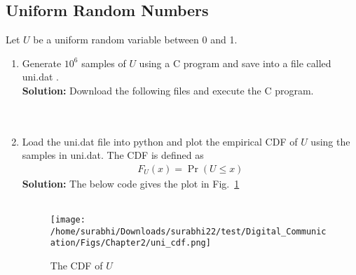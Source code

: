 \documentclass[journal,10pt,twocolumn]{IEEEtran}
\newcounter{Chapcounter}
\numberwithin{equation}{subsection}
\numberwithin{figure}{subsection}
\renewcommand\thesection{\theChapcounter.\arabic{section}}
\newcommand\figref{Fig.~\ref}
\providecommand{\pr}[1]{\ensuremath{\Pr\left(#1\right)}}
\newcommand{\solution}{\noindent \textbf{Solution: }}
\renewcommand\thesection{\arabic{section}}
\renewcommand\thesubsection{\thesection.\arabic{subsection}}
\begin{document}
\subsection{\textbf{Uniform Random Numbers}}
Let $U$ be a uniform random variable between 0 and 1.
\begin{enumerate}[label=\thesubsection.\arabic*,ref=\thesubsection.\arabic{figure}]%
\item
Generate $10^6$ samples of $U$ using a C program and save into a file called uni.dat .
\\
\solution Download the following files and execute the  C program.\\
\\
\

\item
Load the uni.dat file into python and plot the empirical CDF of $U$ using the samples in uni.dat. The CDF is defined as
\begin{align}
F_{U}(x) = \pr{U \le x}
\end{align}
\solution  The below code gives the plot in \figref{fig:uni_cdf}\\
\

\begin{figure}[!ht]
\centering
\texttt{[image: /home/surabhi/Downloads/surabhi22/test/Digital\_Communication/Figs/Chapter2/uni\_cdf.png]}
\caption{The CDF of $U$}
\label{fig:uni_cdf}
\end{figure}


\end{enumerate}
\end{document}
